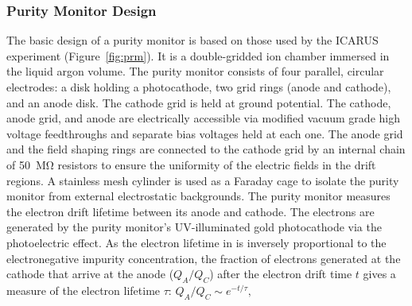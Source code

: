 \subsubsection{Purity Monitor Design}

The basic design of a purity monitor is based on those used by the ICARUS experiment (Figure~\ref{fig:prm})\cite{Adamowski:2014daa}. It is a double-gridded ion chamber immersed in the liquid argon volume.   The purity monitor consists of four parallel, circular electrodes: a disk holding a photocathode, two grid rings (anode and cathode), and an anode disk. The cathode grid is held at ground potential. The cathode, anode grid, and anode are electrically accessible via modified vacuum grade high voltage feedthroughs and separate bias voltages held at each one.  The anode grid and the field shaping rings are connected to the cathode grid by an internal chain of \SI{50}{\mega\ohm} resistors to ensure the uniformity of the electric fields in the drift regions. A stainless mesh cylinder is used as a Faraday cage to isolate the purity monitor from external electrostatic backgrounds. The purity monitor measures the electron drift lifetime between its anode and cathode. The electrons are generated by the purity monitor's UV-illuminated gold photocathode via the photoelectric effect. As the electron lifetime in  is inversely proportional to the electronegative impurity concentration, the fraction of electrons generated at the cathode that arrive at the anode ($Q_A/Q_C$) after the electron drift time $t$ gives a measure of the electron lifetime $\tau$:
%
\( Q_A/Q_C \sim e^{-t/\tau},\)
%

